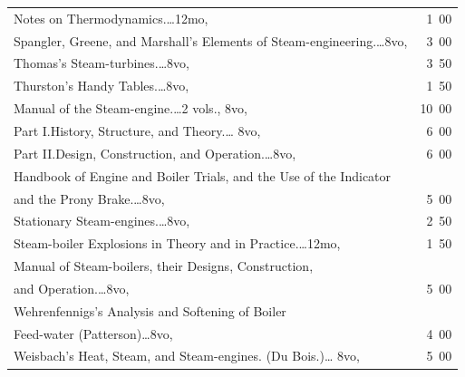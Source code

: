 \documentclass[a4paper,12pt]{book}[2004/02/16]
\providecommand{\colorbox}[2]{#2}
\newcommand{\correction}[2]{\colorbox{corr}{#1}}
\theoremstyle{ilemma}
\theoremstyle{itheorem}
\theoremstyle{iother}
\theoremstyle{icorollary}
\theoremstyle{numcorollary}
\theoremstyle{idefinition}
\begin{document}
\begin{longtable}{@{}l@{ }r@{}}
\indent Notes on Thermodynamics.\dotfill\ldots 12mo, &1\ 00\\

Spangler, Greene, and Marshall's Elements of
Steam-engineering.\dotfill\ldots 8vo, &3\ 00\\

Thomas's Steam-turbines.\dotfill\ldots 8vo, &3\ 50\\

Thurston's Handy Tables.\dotfill\ldots 8vo, &1\ 50\\

\indent Manual of the Steam-engine.\dotfill\ldots 2 vols., 8vo, &10\ 00\\

\indent Part I.\quad History, Structure, and Theory.\dotfill\ldots
8vo, &6\ 00\\

\indent Part II.\quad Design, Construction, and
Operation.\dotfill\ldots 8vo, &6\ 00\\

\indent Handbook of Engine and Boiler Trials, and the Use of the Indicator\\

\nopagebreak

\indent\indent and the Prony Brake.\dotfill\ldots 8vo, &5\ 00\\

\indent Stationary Steam-engines.\dotfill\ldots 8vo, &2\ 50\\

\indent Steam-boiler Explosions in Theory and in
Practice.\dotfill\ldots 12mo, &1\ 50\\

\indent Manual of Steam-boilers, their Designs, Construction,\\

\nopagebreak

\indent\indent and Operation.\dotfill\ldots 8vo, &5\ 00\\

\correction{Wehrenfennigs's}{Wehrenfenning's} Analysis and Softening of Boiler\\

\nopagebreak

\indent\indent Feed-water (Patterson)\dotfill\ldots 8vo, &4\ 00\\

Weisbach's Heat, Steam, and Steam-engines. (Du Bois.)\dotfill\ldots
8vo, &5\ 00\\


\end{longtable}
\end{document}
